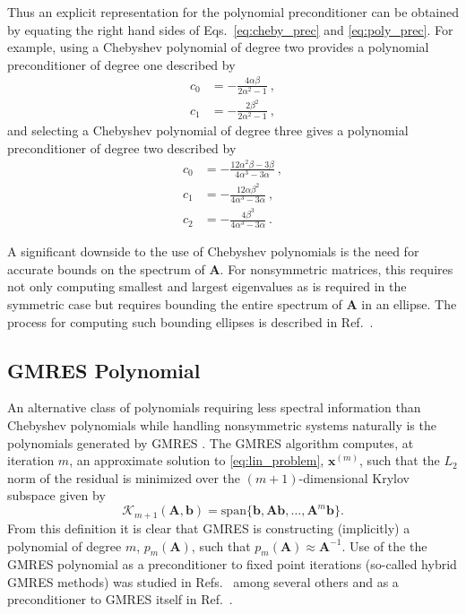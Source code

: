 \documentclass[10pt]{article}
\newcommand{\bx}{\ensuremath{\mathbf{x}}}
\newcommand{\bb}{\ensuremath{\mathbf{b}}}
\newcommand{\bA}{\ensuremath{\mathbf{A}}}
\newcommand{\calK}{\ensuremath{\mathcal{K}}}
\begin{document}
Thus an explicit representation for the polynomial preconditioner can
be obtained by equating the right hand sides of Eqs.~\eqref{eq:cheby_prec}
and \eqref{eq:poly_prec}.  For example, using a Chebyshev polynomial of
degree two provides a polynomial preconditioner of degree one described by
\begin{equation}
\begin{aligned}
c_0 &= - \frac{4 \alpha \beta}{2 \alpha^2 -1} \:, \\
c_1 &= - \frac{2 \beta^2}{2 \alpha^2 - 1} \:,
\end{aligned}
\end{equation}
and selecting a Chebyshev polynomial of degree three gives a polynomial
preconditioner of degree two described by
\begin{equation}
\begin{aligned}
c_0 &= - \frac{12 \alpha^2 \beta - 3 \beta}{4 \alpha^3 - 3 \alpha} \:, \\
c_1 &= - \frac{12 \alpha \beta^2}{4 \alpha^3 - 3 \alpha} \:, \\
c_2 &= - \frac{4 \beta^3}{4 \alpha^3 - 3 \alpha} \:.
\end{aligned}
\end{equation}

A significant downside to the use of Chebyshev polynomials is the need for
accurate bounds on the spectrum of $\bA$.  For nonsymmetric matrices,
this requires not only computing smallest and largest eigenvalues as is
required in the symmetric case but requires
bounding the entire spectrum of $\bA$ in an ellipse.  The process for
computing such bounding ellipses is described in Ref.~\cite{manteuffel_77}.

\subsection{GMRES Polynomial}
\label{subsec:gmres}

An alternative class of polynomials requiring less spectral information
than Chebyshev polynomials
while handling nonsymmetric systems naturally is the polynomials generated
by GMRES \cite{saad_86}.  The GMRES algorithm computes, at iteration $m$,
an approximate solution to \eqref{eq:lin_problem}, $\bx^{(m)}$,
such that the $L_2$ norm of the residual
is minimized over the $(m+1)$-dimensional Krylov subspace given by
\begin{equation}
\calK_{m+1}(\bA,\bb) = \text{span}\{ \bb, \bA \bb, \ldots, \bA^{m} \bb \}.
\end{equation}
From this definition it is clear that GMRES is constructing (implicitly)
a polynomial of degree $m$, $p_m(\bA)$, such that $p_m(\bA) \approx \bA^{-1}$.
Use of the the GMRES polynomial as a preconditioner to fixed point iterations
(so-called hybrid GMRES methods)
was studied in Refs.~\cite{nachtigal_92,joubert_94} among several others
and as a preconditioner to {GMRES} itself in Ref.~\cite{liu_14}.
\end{document}
